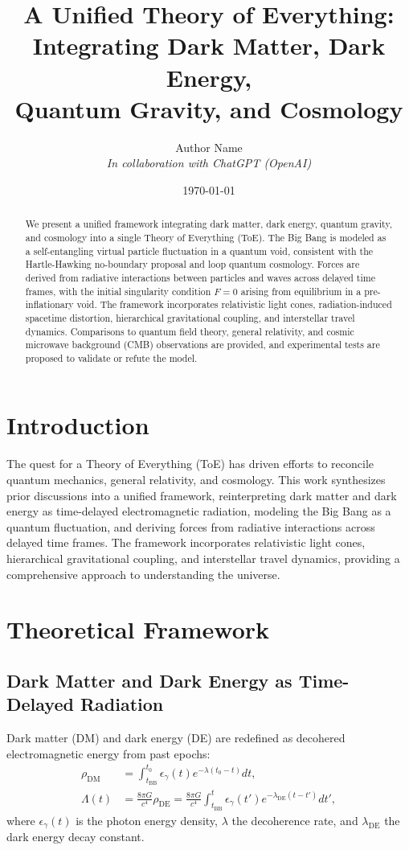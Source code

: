 \documentclass{article}
\title{A Unified Theory of Everything: Integrating Dark Matter, Dark Energy, \\ Quantum Gravity, and Cosmology}
\author{Author Name \\ \textit{In collaboration with ChatGPT (OpenAI)}}
\date{\today}
\begin{document}
\maketitle

\begin{abstract}
We present a unified framework integrating dark matter, dark energy, quantum gravity, and cosmology into a single Theory of Everything (ToE). The Big Bang is modeled as a self-entangling virtual particle fluctuation in a quantum void, consistent with the Hartle-Hawking no-boundary proposal and loop quantum cosmology. Forces are derived from radiative interactions between particles and waves across delayed time frames, with the initial singularity condition \( F = 0 \) arising from equilibrium in a pre-inflationary void. The framework incorporates relativistic light cones, radiation-induced spacetime distortion, hierarchical gravitational coupling, and interstellar travel dynamics. Comparisons to quantum field theory, general relativity, and cosmic microwave background (CMB) observations are provided, and experimental tests are proposed to validate or refute the model.
\end{abstract}

\section{Introduction}
The quest for a Theory of Everything (ToE) has driven efforts to reconcile quantum mechanics, general relativity, and cosmology. This work synthesizes prior discussions into a unified framework, reinterpreting dark matter and dark energy as time-delayed electromagnetic radiation, modeling the Big Bang as a quantum fluctuation, and deriving forces from radiative interactions across delayed time frames. The framework incorporates relativistic light cones, hierarchical gravitational coupling, and interstellar travel dynamics, providing a comprehensive approach to understanding the universe.

\section{Theoretical Framework}
\subsection{Dark Matter and Dark Energy as Time-Delayed Radiation}
Dark matter (DM) and dark energy (DE) are redefined as decohered electromagnetic energy from past epochs:
\begin{align}
\rho_{\text{DM}} &= \int_{t_{\text{BB}}}^{t_0} \epsilon_{\gamma}(t) e^{-\lambda (t_0 - t)} dt, \label{eq:dm} \\
\Lambda(t) &= \frac{8\pi G}{c^4} \rho_{\text{DE}} = \frac{8\pi G}{c^4} \int_{t_{\text{BB}}}^{t} \epsilon_{\gamma}(t') e^{-\lambda_{\text{DE}} (t - t')} dt', \label{eq:de}
\end{align}
where \( \epsilon_{\gamma}(t) \) is the photon energy density, \( \lambda \) the decoherence rate, and \( \lambda_{\text{DE}} \) the dark energy decay constant.
\end{document}
